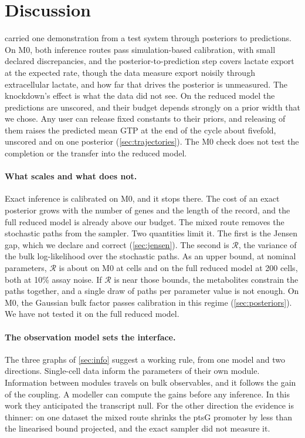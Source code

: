 \section{Discussion}
\label{sec:discussion}

\IC{} carried one demonstration from a test system through posteriors to predictions. On M0, both inference routes pass simulation-based calibration, with small
declared discrepancies, and the posterior-to-prediction step covers lactate export at the expected rate, though the data measure export noisily through extracellular lactate, and how far that drives the posterior is unmeasured. The knockdown's effect is what the data did not see. On the reduced model the predictions are unscored, and their budget depends strongly on
a prior width that we chose. Any user can release fixed constants to their priors, and releasing  of them raises the predicted mean GTP at the end of the cycle about fivefold, unscored and on one posterior (\cref{sec:trajectories}). The M0 check does not test the completion or the transfer into the reduced model.

\paragraph{What scales and what does not.} Exact inference is calibrated on M0, and it stops there. The cost of an exact posterior grows with
the number of genes and the length of the record, and the full reduced model is
already above our budget. The mixed route removes the stochastic paths from
the sampler. Two quantities limit it. The first is the Jensen gap, which we declare
and correct (\cref{sec:jensen}). The second is $\mathcal{R}$, the variance of the bulk log-likelihood over the stochastic paths. As an upper bound, at nominal parameters, $\mathcal{R}$ is about  on M0 at  cells and  on the full reduced model at 200 cells, both at 10\% assay noise. If $\mathcal{R}$ is near those bounds, the metabolites constrain the paths together, and a single draw of paths per parameter value is not enough. On M0, the Gaussian bulk factor passes calibration
in this regime (\cref{sec:posteriors}). We have not tested it on the full reduced model.

\paragraph{The observation model sets the interface.} The three graphs of
\cref{sec:info} suggest a working rule, from one model and two directions. Single-cell data inform the parameters of their
own module. Information between modules travels on bulk observables, and it follows
the gain of the coupling. A modeller can compute the gains before any inference. In this work they anticipated the transcript null. For the other direction the evidence is thinner: on one dataset the mixed route shrinks the ptsG promoter by less than the linearised bound projected, and the exact sampler did not measure it.

